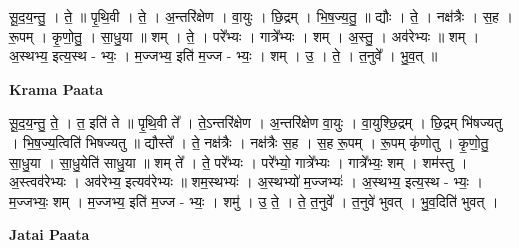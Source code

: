 \documentclass[17pt]{extarticle}
\begin{document}
सू॒द॒य॒न्तु॒ । ते॒ ॥ पृ॒थि॒वी । ते॒ । अ॒न्तरि॑क्षेण । वा॒युः । छि॒द्रम् । भि॒ष॒ज्य॒तु॒ ॥ द्यौः । ते॒ । नक्ष॑त्रैः । स॒ह । रू॒पम् । कृ॒णो॒तु॒ । सा॒धु॒या ॥ शम् । ते॒ । परे᳚भ्यः । गात्रे᳚भ्यः । शम् । अ॒स्तु॒ । अव॑रेभ्यः ॥ शम् । अ॒स्थभ्य॒ इत्य॒स्थ - भ्यः॒ । म॒ज्जभ्य॒ इति॑ म॒ज्ज - भ्यः॒ । शम् । उ॒ । ते॒ । त॒नुवे᳚ । भु॒व॒त् ॥  \newline


\textbf{Krama Paata} \newline

सू॒द॒य॒न्तु॒ ते॒ । त॒ इति॑ ते ॥ पृ॒थि॒वी ते᳚ । ते॒ऽन्तरि॑क्षेण । अ॒न्तरि॑क्षेण वा॒युः । वा॒युश्छि॒द्रम् । छि॒द्रम् भि॑षज्यतु । भि॒ष॒ज्य॒त्विति॑ भिषज्यतु ॥ द्यौस्ते᳚ । ते॒ नक्ष॑त्रैः । नक्ष॑त्रैः स॒ह । स॒ह रू॒पम् । रू॒पम् कृ॑णोतु । कृ॒णो॒तु॒ सा॒धु॒या । सा॒धु॒येति॑ साधु॒या ॥ शम् ते᳚ । ते॒ परे᳚भ्यः । परे᳚भ्यो॒ गात्रे᳚भ्यः । गात्रे᳚भ्यः॒ शम् । शम॑स्तु । अ॒स्त्वव॑रेभ्यः । अव॑रेभ्य॒ इत्यव॑रेभ्यः ॥ शम॒स्थभ्यः॑ । अ॒स्थभ्यो॑ म॒ज्जभ्यः॑ । अ॒स्थभ्य॒ इत्य॒स्थ - भ्यः॒ । म॒ज्जभ्यः॒ शम् । म॒ज्जभ्य॒ इति॑ म॒ज्ज - भ्यः॒ । शमु॑ । उ॒ ते॒ । ते॒ त॒नुवे᳚ । त॒नुवे॑ भुवत् । भु॒व॒दिति॑ भुवत् । \newline

\textbf{Jatai Paata} \newline
\end{document}
